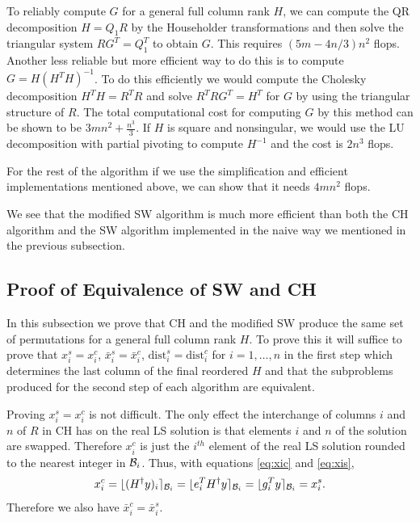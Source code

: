 \documentclass[12pt,Bold,letterpaper]{mcgilletdclass}
\newcommand{\be}{\begin{equation}}
\newcommand{\ee}{\end{equation}}
\newcommand{\dist}{\mathrm{dist}}
\newcommand{\vsp}{\vspace{\baselineskip}}
\begin{document}
To reliably compute $G$ for a general full column rank $H$,
we can compute the  QR decomposition $H=Q_1R$ by the Householder transformations
and then solve the triangular system  $RG^T=Q_1^T$ to obtain $G$.
This requires $(5m-4n/3)n^2$ flops. 
Another less reliable but more efficient way to do this is to compute $G=H(H^TH)^{-1}$. 
To do this efficiently we would compute the Cholesky decomposition  $H^TH = R^TR$ and solve 
$R^TRG^T = H^T$ for $G$ by using the triangular structure of $R$. 
The total computational cost for computing $G$ by this method can be shown to be $3mn^2+\frac{n^3}{3}$.
If $H$ is square and nonsingular, we would use the LU decomposition with partial pivoting to compute $H^{-1}$
and the cost is $2n^3$ flops.

For the rest of the algorithm if we use the simplification and efficient implementations
mentioned above, we can show that it needs $4mn^2$ flops. 

We see that the modified SW algorithm is much more efficient than both the CH algorithm
and the SW algorithm implemented in the naive way we mentioned in the previous subsection.

\vsp \subsection{Proof of Equivalence of SW and CH}
In this subsection we prove that  CH and  the modified  SW produce the same set of permutations
for a general full column rank $H$.
To prove this it will suffice to prove that $x_i^s = x_i^c$, $\bar{x}_i^s =\bar{x}_i^c$,
$\dist_i^s = \dist_i^c$ for $i=1, \ldots, n$ in the first step which determines the last column of the final reordered $H$
and that the subproblems produced for the second step of
each algorithm are equivalent. 

Proving $x_i^s = x_i^c$ is not difficult.
The only effect the interchange of columns $i$  and $n$ of $R$ in CH  
has on the real LS solution is that elements $i$ and $n$ of the solution are swapped.
Therefore $x_i^c$ is just the $i^{th}$ element of the real LS
solution rounded to the nearest integer in ${{\cal B}_i }$. 
Thus, with equations \eqref{eq:xic} and \eqref{eq:xis},
\be
x_i^c=   \lfloor (H^{\dagger}y)_i  \rceil_{{\cal B}_i }
=  \lfloor e_i^T H^{\dagger}y   \rceil_{{\cal B}_i }
=  \lfloor g_i^T  y \rceil_{{\cal B}_i } =x_i^s.
\label{eq:xics}
\ee
Therefore we also have $\bar{x}_i^c=\bar{x}_i^s$.
\end{document}
